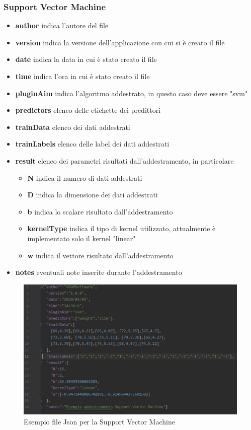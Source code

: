 		\subsubsection{Support Vector Machine}
			\begin{itemize}
				\item \textbf{author} indica l'autore del file
				\item \textbf{version} indica la versione dell'applicazione con cui si è creato il file
				\item \textbf{date} indica la data in cui è stato creato il file
				\item \textbf{time} indica l'ora in cui è stato creato il file
				\item \textbf{pluginAim} indica l'algoritmo addestrato, in questo caso deve essere "svm"
				\item \textbf{predictors} elenco delle etichette dei predittori
				\item \textbf{trainData} elenco dei dati addestrati
				\item \textbf{trainLabels} elenco delle label dei dati addestrati
				\item \textbf{result} elenco dei parametri risultati dall'addestramento, in particolare 
				\begin{itemize}
					\item \textbf{N} indica il numero di dati addestrati
					\item \textbf{D} indica la dimensione dei dati addestrati
					\item \textbf{b} indica lo scalare risultato dall'addestramento
					\item \textbf{kernelType} indica il tipo di kernel utilizzato, attualmente è implementato solo il kernel "linear"
					\item \textbf{w} indica il vettore risultato dall'addestramento					
				\end{itemize}
				\item \textbf{notes} eventuali note inserite durante l'addestramento
			\end{itemize}
		\mbox{}
		\begin{figure} [H]
			\begin{center}
				\includegraphics[width=\linewidth]{./img/jsonSvm.jpg}
			\end{center}
			\caption{Esempio file Json per la Support Vector Machine}
		\end{figure}
